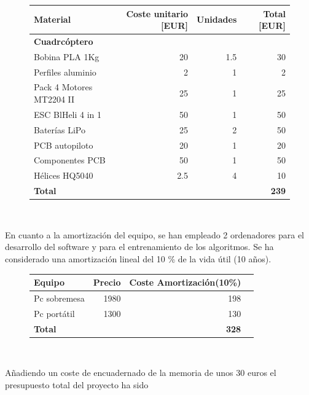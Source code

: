 \begin{figure}[htb!]
	\centering
	\begin{tabular}{|l|r|r|r|}
		\hline
		\textbf{Material} &Coste unitario [EUR] &Unidades&Total [EUR]\\
		
		\hline
		
		\textbf{Cuadrcóptero}& & &  \\
		Bobina PLA 1Kg & 20 & 1.5 &  30 \\
		Perfiles aluminio & 2 & 1 & 2\\
		Pack 4 Motores MT2204 II & 25 &1& 25 \\
		ESC BlHeli 4 in 1  & 50 & 1 & 50\\
		Baterías LiPo & 25 & 2 & 50\\
		PCB autopiloto & 20 & 1 & 20\\
		Componentes PCB & 50 & 1  & 50 \\
		Hélices HQ5040 &2.5&4&10\\
		\hline
		\textbf{Total} & &  & \textbf{239}\\
		\hline
	\end{tabular}\\
\end{figure}

En cuanto a la amortización del equipo, se han empleado 2 ordenadores para el desarrollo del software y para el entrenamiento de los algoritmos. Se ha considerado una amortización lineal del 10 \% de la vida útil (10 años).

\begin{figure}[htb!]
	\centering
	\begin{tabular}{|l|r|r|r|}
		\hline
		\textbf{Equipo} & Precio &Coste Amortización(10\%)\\
		\hline
		
		Pc sobremesa & 1980 & 198\\
		Pc portátil & 1300 & 130\\
		\hline
		\textbf{Total} & & \textbf{328}\\
		\hline
\end{tabular}\\
\end{figure}

Añadiendo un coste de encuadernado de la memoria de unos 30 euros el presupuesto total del proyecto ha sido



